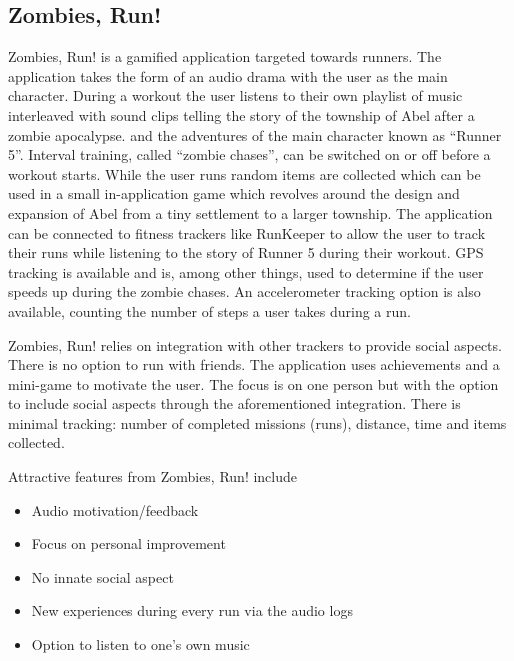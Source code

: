 \subsection{Zombies, Run!}
Zombies, Run! is a gamified application targeted towards runners. The application takes the form of an audio drama with the user as the main character. During a workout the user listens to their own playlist of music interleaved with sound clips telling the story of the township of Abel after a zombie apocalypse. and the adventures of the main character known as ``Runner 5''. Interval training, called ``zombie chases'', can be switched on or off before a workout starts. While the user runs random items are collected which can be used in a small in-application game which revolves around the design and expansion of Abel from a tiny settlement to a larger township. The application can be connected to fitness trackers like RunKeeper to allow the user to track their runs while listening to the story of Runner 5 during their workout. \ac{GPS} tracking is available and is, among other things, used to determine if the user speeds up during the zombie chases. An accelerometer tracking option is also available, counting the number of steps a user takes during a run.

Zombies, Run! relies on integration with other trackers to provide social aspects. There is no option to run with friends. The application uses achievements and a mini-game to motivate the user. The focus is on one person but with the option to include social aspects through the aforementioned integration. There is minimal tracking: number of completed missions (runs), distance, time and items collected.

Attractive features from Zombies, Run! include

\begin{itemize}
	\item{Audio motivation/feedback}
	\item{Focus on personal improvement}
	\item{No innate social aspect}
	\item{New experiences during every run via the audio logs}
	\item{Option to listen to one's own music}
\end{itemize}

